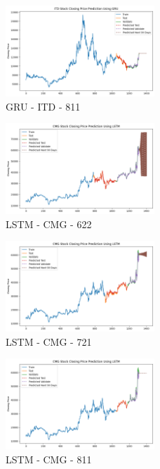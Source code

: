 \documentclass{ieeeojies}
\begin{document}
\begin{figure} [H]
    \centering
    \includegraphics[width=0.5\textwidth]{bibliography/Figure/GRU_ITD_811_90.png}
    \caption{GRU - ITD - 811}
    \label{fig:GRU_ITD_811_90}
\end{figure}
\begin{figure} [H]
    \centering
    \includegraphics[width=0.5\textwidth]{bibliography/Figure/LSTM_CMG_622_90.png}
    \caption{LSTM - CMG - 622}
    \label{fig:LSTM_CMG_622_90}
\end{figure}
\begin{figure} [H]
    \centering
    \includegraphics[width=0.5\textwidth]{bibliography/Figure/LSTM_CMG_721_90.png}
    \caption{LSTM - CMG - 721}
    \label{fig:LSTM_CMG_721_90}
\end{figure}
\begin{figure} [H]
    \centering
    \includegraphics[width=0.5\textwidth]{bibliography/Figure/LSTM_CMG_811_90.png}
    \caption{LSTM - CMG - 811}
    \label{fig:LSTM_CMG_811_90}
\end{figure}
\end{document}
